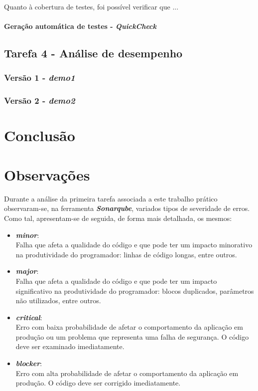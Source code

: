 \documentclass[a4paper]{report}
\begin{document}
Quanto à cobertura de testes, foi possível verificar que ...

\subsubsection{Geração automática de testes - \textit{QuickCheck}}

\section{Tarefa 4 - Análise de desempenho}
\subsection{Versão 1 - \textit{demo1}}
\subsection{Versão 2 - \textit{demo2}}

\chapter{Conclusão}

\appendix
\chapter{Observações}
Durante a análise da primeira tarefa associada a este trabalho prático observaram-se, na ferramenta \textit{\textbf{Sonarqube}}, variados tipos de severidade de erros. Como tal, apresentam-se de seguida, de forma mais detalhada, os mesmos:
\begin{itemize}
    \item \textbf{\textit{minor}}:
    \\ Falha que afeta a qualidade do código e que pode ter um impacto minorativo na produtividade do programador: linhas de código longas, entre outros.
    \item \textbf{\textit{major}}:
    \\ Falha que afeta a qualidade do código e que pode ter um impacto significativo na produtividade do programador: blocos duplicados, parâmetros não utilizados, entre outros.
    \item \textbf{\textit{critical}}:
    \\ Erro com baixa probabilidade de afetar o comportamento da aplicação em produção ou um problema que representa uma falha de segurança. O código deve ser examinado imediatamente.
    \item \textbf{\textit{blocker}}:
    \\ Erro com alta probabilidade de afetar o comportamento da aplicação em produção. O código deve ser corrigido imediatamente.
\end{itemize}
\end{document}
